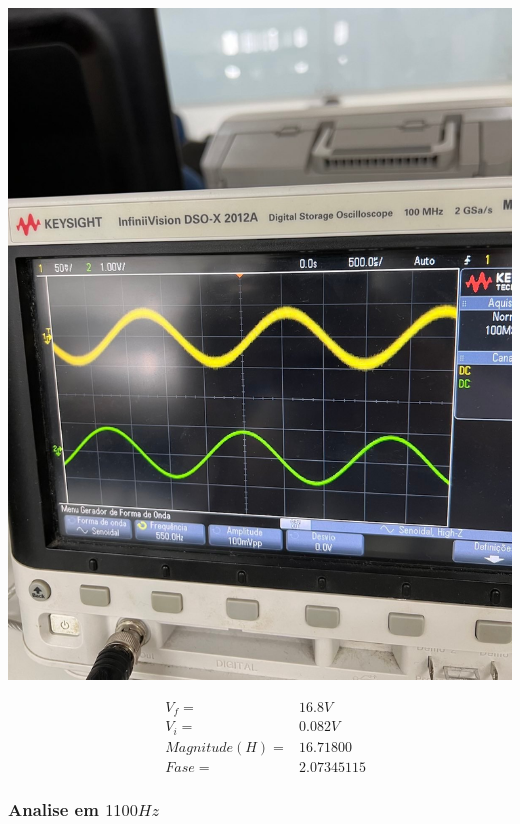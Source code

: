 \documentclass[12pt,twoside, a4paper, twocolumn]{article}
\begin{document}
\begin{adjustbox}{scale=0.18}
    \includegraphics{freq550.jpeg}
\end{adjustbox}

\begin{equation*}
    \begin{aligned}
         & V_f =          & 16.8V      \\
         & V_i =          & 0.082V     \\
         & Magnitude(H) = & 16.71800   \\
         & Fase =         & 2.07345115
    \end{aligned}
\end{equation*}

\subsubsection{Analise em $1100Hz$}
\subparagraph*{}
\end{document}
